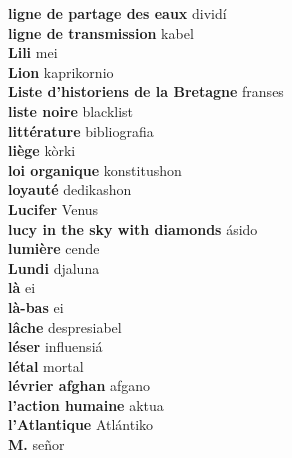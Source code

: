 \textbf{ ligne de partage des eaux  } dividí \\
\textbf{ ligne de transmission  } kabel \\
\textbf{ Lili  } mei \\
\textbf{ Lion  } kaprikornio \\
\textbf{ Liste d’historiens de la Bretagne  } franses \\
\textbf{ liste noire  } blacklist \\
\textbf{ littérature  } bibliografia \\
\textbf{ liège  } kòrki \\
\textbf{ loi organique  } konstitushon \\
\textbf{ loyauté  } dedikashon \\
\textbf{ Lucifer  } Venus \\
\textbf{ lucy in the sky with diamonds  } ásido \\
\textbf{ lumière  } cende \\
\textbf{ Lundi  } djaluna \\
\textbf{ là  } ei \\
\textbf{ là-bas  } ei \\
\textbf{ lâche  } despresiabel \\
\textbf{ léser  } influensiá \\
\textbf{ létal  } mortal \\
\textbf{ lévrier afghan  } afgano \\
\textbf{ l’action humaine  } aktua \\
\textbf{ l’Atlantique  } Atlántiko \\
\textbf{ M.  } señor \\
